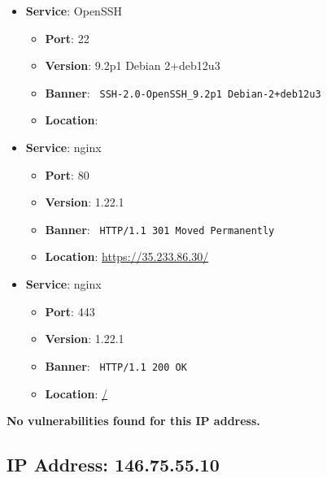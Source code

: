 \documentclass{article}
\begin{document}
\begin{itemize}
    
        \item \textbf{Service}: OpenSSH
        \begin{itemize}
            \item \textbf{Port}: 22
            \item \textbf{Version}:  9.2p1 Debian 2+deb12u3 
            \item \textbf{Banner}: \texttt{
                SSH-2.0-OpenSSH\_9.2p1 Debian-2+deb12u3
            }
            \item \textbf{Location}: \href{  }{  }
        \end{itemize}
    
        \item \textbf{Service}: nginx
        \begin{itemize}
            \item \textbf{Port}: 80
            \item \textbf{Version}:  1.22.1 
            \item \textbf{Banner}: \texttt{
                HTTP/1.1 301 Moved Permanently
            }
            \item \textbf{Location}: \href{ https://35.233.86.30/ }{ https://35.233.86.30/ }
        \end{itemize}
    
        \item \textbf{Service}: nginx
        \begin{itemize}
            \item \textbf{Port}: 443
            \item \textbf{Version}:  1.22.1 
            \item \textbf{Banner}: \texttt{
                HTTP/1.1 200 OK
            }
            \item \textbf{Location}: \href{ / }{ / }
        \end{itemize}
    
\end{itemize}


\textbf{No vulnerabilities found for this IP address.}




\clearpage



\subsection*{IP Address: 146.75.55.10}
\end{document}
